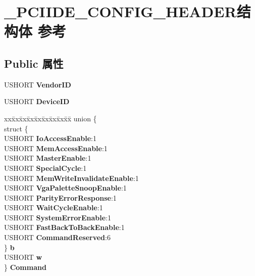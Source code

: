 \hypertarget{struct___p_c_i_i_d_e___c_o_n_f_i_g___h_e_a_d_e_r}{}\section{\+\_\+\+P\+C\+I\+I\+D\+E\+\_\+\+C\+O\+N\+F\+I\+G\+\_\+\+H\+E\+A\+D\+E\+R结构体 参考}
\label{struct___p_c_i_i_d_e___c_o_n_f_i_g___h_e_a_d_e_r}
\subsection*{Public 属性}
\begin{DoxyCompactItemize}
\item 
\mbox{\label{struct___p_c_i_i_d_e___c_o_n_f_i_g___h_e_a_d_e_r_ab8de2657dca6f9d43f9c7723b4c7cbff}} 
U\+S\+H\+O\+RT {\bfseries Vendor\+ID}
\item 
\mbox{\label{struct___p_c_i_i_d_e___c_o_n_f_i_g___h_e_a_d_e_r_a4947109c902c839adb88bb84d6064bd1}} 
U\+S\+H\+O\+RT {\bfseries Device\+ID}
\item 
\mbox{\label{struct___p_c_i_i_d_e___c_o_n_f_i_g___h_e_a_d_e_r_ad4ce2064417a6770b81ab8f3bbfc183e}} 
\begin{tabbing}
xx\=xx\=xx\=xx\=xx\=xx\=xx\=xx\=xx\=\kill
union \{\\
\>struct \{\\
\>\>USHORT {\bfseries IoAccessEnable}:1\\
\>\>USHORT {\bfseries MemAccessEnable}:1\\
\>\>USHORT {\bfseries MasterEnable}:1\\
\>\>USHORT {\bfseries SpecialCycle}:1\\
\>\>USHORT {\bfseries MemWriteInvalidateEnable}:1\\
\>\>USHORT {\bfseries VgaPaletteSnoopEnable}:1\\
\>\>USHORT {\bfseries ParityErrorResponse}:1\\
\>\>USHORT {\bfseries WaitCycleEnable}:1\\
\>\>USHORT {\bfseries SystemErrorEnable}:1\\
\>\>USHORT {\bfseries FastBackToBackEnable}:1\\
\>\>USHORT {\bfseries CommandReserved}:6\\
\>\} {\bfseries b}\\
\>USHORT {\bfseries w}\\
\} {\bfseries Command}\\


\end{tabbing}
\end{DoxyCompactItemize}
